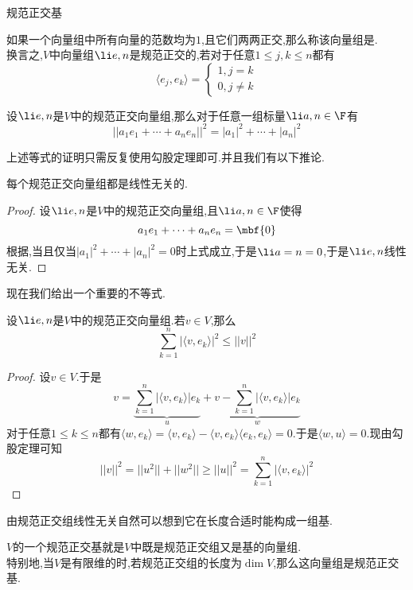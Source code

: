 \documentclass{ctexart}
\begin{document}
\pagestyle{empty}
\begin{center}\large 规范正交基\end{center}
\begin{definition}[1.1 定义:规范正交]
    如果一个向量组中所有向量的范数均为$1$,且它们两两正交,那么称该向量组是.\\
    换言之,$V$中向量组$\li e,n$是规范正交的,若对于任意$1\leqslant j,k\leqslant n$都有
    $$\langle e_j,e_k\rangle=\left\{\begin{array}{l}
        1,j=k\\0,j\neq k
    \end{array}\right.$$
\end{definition}
\begin{formal}[1.2 规范正交组线性组合的范数]
    设$\li e,n$是$V$中的规范正交向量组,那么对于任意一组标量$\li a,n\in\F$有
    $$||a_1e_1+\cdots+a_ne_n||^2=|a_1|^2+\cdots+|a_n|^2$$
\end{formal}\noindent
上述等式的证明只需反复使用勾股定理即可.并且我们有以下推论.
\begin{formal}[1.3 规范正交组线性无关]
    每个规范正交向量组都是线性无关的.
\end{formal}
\begin{proof}
    设$\li e,n$是$V$中的规范正交向量组,且$\li a,n\in\F$使得
    $$a_1e_1+\cdots+a_ne_n=\mbf{0}$$
    根据,当且仅当$|a_1|^2+\cdots+|a_n|^2=0$时上式成立,于是$\li a=n=0$,于是$\li e,n$线性无关.
\end{proof}\noindent
现在我们给出一个重要的不等式.
\begin{formal}[1.4 Bessel不等式]
    设$\li e,n$是$V$中的规范正交向量组.若$v\in V$,那么
    $$\sum_{k=1}^{n}|\langle v,e_k\rangle|^2\leqslant||v||^2$$
\end{formal}
\begin{proof}
    设$v\in V$.于是
    $$v=\underbrace{\sum_{k=1}^{n}|\langle v,e_k\rangle|e_k}_{u}+\underbrace{v-\sum_{k=1}^{n}|\langle v,e_k\rangle|e_k}_w$$
    对于任意$1\leqslant k\leqslant n$都有$\langle w,e_k\rangle=\langle v,e_k\rangle-\langle v,e_k\rangle\langle e_k,e_k\rangle=0$.于是$\langle w,u\rangle=0$.现由勾股定理可知
    $$||v||^2=||u^2||+||w^2||\geqslant||u||^2=\sum_{k=1}^{n}|\langle v,e_k\rangle|^2$$
\end{proof}\noindent
由规范正交组线性无关自然可以想到它在长度合适时能构成一组基.
\begin{definition}[1.5 定义:规范正交基]
    $V$的一个规范正交基就是$V$中既是规范正交组又是基的向量组.\\
    特别地,当$V$是有限维的时,若规范正交组的长度为$\dim V$,那么这向量组是规范正交基.
\end{definition}\noindent
\end{document}
